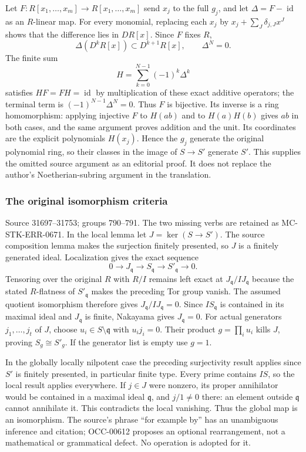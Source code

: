 Let \(F:R[x_1,\ldots,x_m]\to R[x_1,\ldots,x_m]\) send \(x_j\) to the full \(g_j\), and let \(\Delta=F-\operatorname{id}\) as an \(R\)-linear map. For every monomial, replacing each \(x_j\) by \(x_j+\sum_J\delta_{j,J}x^J\) shows that the difference lies in \(D R[x]\). Since \(F\) fixes \(R\), \[
\Delta(D^kR[x])\subset D^{k+1}R[x],\qquad \Delta^N=0.
\] The finite sum \[
H=\sum_{k=0}^{N-1}(-1)^k\Delta^k
\] satisfies \(HF=FH=\operatorname{id}\) by multiplication of these exact additive operators; the terminal term is \((-1)^{N-1}\Delta^N=0\). Thus \(F\) is bijective. Its inverse is a ring homomorphism: applying injective \(F\) to \(H(ab)\) and to \(H(a)H(b)\) gives \(ab\) in both cases, and the same argument proves addition and the unit. Its coordinates are the explicit polynomials \(H(x_j)\). Hence the \(g_j\) generate the original polynomial ring, so their classes in the image of \(S\to S'\) generate \(S'\). This supplies the omitted source argument as an editorial proof. It does not replace the author's Noetherian-subring argument in the translation.

\subsubsection{The original isomorphism criteria}\label{algebra-proof-035-the-original-isomorphism-criteria}

Source 31697--31753; groups 790--791. The two missing verbs are retained as MC-\AlgebraIdentifierBreak{}STK-\AlgebraIdentifierBreak{}ERR-\AlgebraIdentifierBreak{}0671. In the local lemma let \(J=\ker(S\to S')\). The source composition lemma makes the surjection finitely presented, so \(J\) is a finitely generated ideal. Localization gives the exact sequence \[
0\to J_{\mathfrak q}\to S_{\mathfrak q}\to S'_{\mathfrak q}\to0.
\] Tensoring over the original \(R\) with \(R/I\) remains left exact at \(J_{\mathfrak q}/IJ_{\mathfrak q}\) because the stated \(R\)-flatness of \(S'_{\mathfrak q}\) makes the preceding Tor group vanish. The assumed quotient isomorphism therefore gives \(J_{\mathfrak q}/IJ_{\mathfrak q}=0\). Since \(IS_{\mathfrak q}\) is contained in its maximal ideal and \(J_{\mathfrak q}\) is finite, Nakayama gives \(J_{\mathfrak q}=0\). For actual generators \(j_1,\ldots,j_t\) of \(J\), choose \(u_i\in S\setminus\mathfrak q\) with \(u_i j_i=0\). Their product \(g=\prod_i u_i\) kills \(J\), proving \(S_g\cong S'_g\). If the generator list is empty use \(g=1\).

In the globally locally nilpotent case the preceding surjectivity result applies since \(S'\) is finitely presented, in particular finite type. Every prime contains \(IS\), so the local result applies everywhere. If \(j\in J\) were nonzero, its proper annihilator would be contained in a maximal ideal \(\mathfrak q\), and \(j/1\ne0\) there: an element outside \(\mathfrak q\) cannot annihilate it. This contradicts the local vanishing. Thus the global map is an isomorphism. The source's phrase ``for example by'' has an unambiguous inference and citation; OCC-00612 proposes an optional rearrangement, not a mathematical or grammatical defect. No operation is adopted for it.

